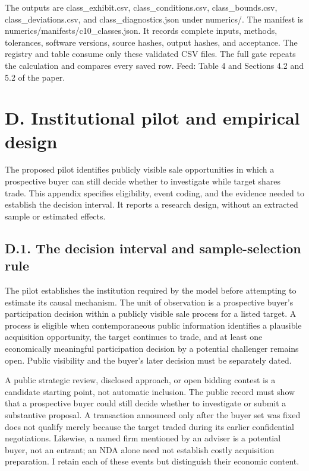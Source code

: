 \documentclass[
  11pt,
]{article}
\begin{document}
The outputs are class\_exhibit.csv, class\_conditions.csv,
class\_bounds.csv, class\_deviations.csv, and class\_diagnostics.json
under numerics/. The manifest is numerics/manifests/c10\_classes.json.
It records complete inputs, methods, tolerances, software versions,
source hashes, output hashes, and acceptance. The registry and table
consume only these validated CSV files. The full gate repeats the
calculation and compares every saved row. Feed: Table 4 and Sections 4.2
and 5.2 of the paper.

\section{D. Institutional pilot and empirical design}\label{oa-d}

The proposed pilot identifies publicly visible sale opportunities in
which a prospective buyer can still decide whether to investigate while
target shares trade. This appendix specifies eligibility, event coding,
and the evidence needed to establish the decision interval. It reports a
research design, without an extracted sample or estimated effects.

\subsection{D.1. The decision interval and sample-selection
rule}\label{oa-d-selection}

The pilot establishes the institution required by the model before
attempting to estimate its causal mechanism. The unit of observation is
a prospective buyer's participation decision within a publicly visible
sale process for a listed target. A process is eligible when
contemporaneous public information identifies a plausible acquisition
opportunity, the target continues to trade, and at least one
economically meaningful participation decision by a potential challenger
remains open. Public visibility and the buyer's later decision must be
separately dated.

A public strategic review, disclosed approach, or open bidding contest
is a candidate starting point, not automatic inclusion. The public
record must show that a prospective buyer could still decide whether to
investigate or submit a substantive proposal. A transaction announced
only after the buyer set was fixed does not qualify merely because the
target traded during its earlier confidential negotiations. Likewise, a
named firm mentioned by an adviser is a potential buyer, not an entrant;
an NDA alone need not establish costly acquisition preparation. I retain
each of these events but distinguish their economic content.
\end{document}
